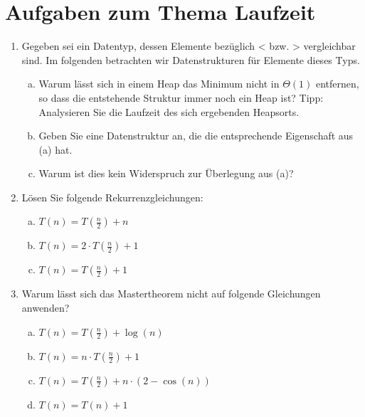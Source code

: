 \documentclass{scrartcl}
\begin{document}
\section*{Aufgaben zum Thema Laufzeit}
\begin{enumerate}[(1)]

\item Gegeben sei ein Datentyp, dessen Elemente bez\"uglich < bzw. > vergleichbar sind. Im folgenden betrachten wir Datenstrukturen f\"ur Elemente dieses Typs.
\begin{enumerate}[(a)]
\item Warum l\"asst sich in einem Heap das Minimum nicht in $\Theta(1)$ entfernen, so dass die entstehende Struktur immer noch ein Heap ist? \newline
Tipp: Analysieren Sie die Laufzeit des sich ergebenden Heapsorts.
\item Geben Sie eine Datenstruktur an, die die entsprechende Eigenschaft aus (a) hat.
\item Warum ist dies kein Widerspruch zur \"Uberlegung aus (a)?
\end{enumerate}

\item L\"osen Sie folgende Rekurrenzgleichungen:
\begin{enumerate}[(a)]
\item $T(n)=T(\frac{n}{2})+n$
\item $T(n)=2\cdot T(\frac{n}{2})+1$
\item $T(n)=T(\frac{n}{2})+1$
\end{enumerate}

\item Warum l\"asst sich das Mastertheorem nicht auf folgende Gleichungen anwenden?
\begin{enumerate}[(a)]
\item $T(n)=T(\frac{n}{2})+\log(n)$
\item $T(n)=n\cdot T(\frac{n}{2})+1$
\item $T(n)=T(\frac{n}{2})+n\cdot(2-\cos(n))$
\item $T(n)=T(n)+1$
\end{enumerate}

\end{enumerate}
\end{document}
